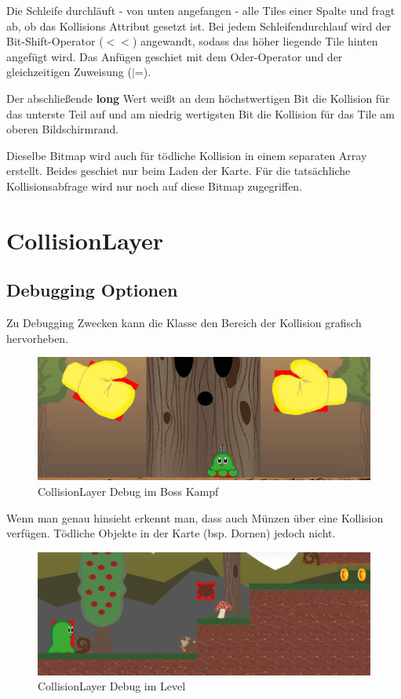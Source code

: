 Die Schleife durchläuft - von unten angefangen - alle Tiles einer Spalte und fragt ab, ob das Kollisions Attribut gesetzt ist. Bei jedem Schleifendurchlauf wird der Bit-Shift-Operator ($<<$) angewandt, sodass das höher liegende Tile hinten angefügt wird. Das Anfügen geschiet mit dem Oder-Operator und der gleichzeitigen Zuweisung ($|$=).

Der abschließende \textbf{long} Wert weißt an dem höchstwertigen Bit die Kollision für das unterste Teil auf und am niedrig wertigsten Bit die Kollision für das Tile am oberen Bildschirmrand.

Dieselbe Bitmap wird auch für tödliche Kollision in einem separaten Array erstellt. Beides geschiet nur beim Laden der Karte. Für die tatsächliche Kollisionsabfrage wird nur noch auf diese Bitmap zugegriffen.



\section{CollisionLayer}\label{sec:4_CollisionLayer}
\subsection{Debugging Optionen}\label{sec:CollisionLayerDebug}

Zu Debugging Zwecken kann die  Klasse den Bereich der Kollision grafisch hervorheben.

\begin{figure}[H]
  \centering
  \includegraphics[width=\textwidth - 50pt]{resources/CollisionLayer_BossKampf.jpg}
  \caption{CollisionLayer Debug im Boss Kampf}
  \label{fig:collision_debug_boss} 
\end{figure}

Wenn man genau hinsieht erkennt man, dass auch Münzen über eine Kollision verfügen. Tödliche Objekte in der Karte (bsp. Dornen) jedoch nicht.

\begin{figure}[H]
  \centering
  \includegraphics[width=\textwidth - 50pt]{resources/CollisionLayer_Level}
  \caption{CollisionLayer Debug im Level}
  \label{fig:collision_debug_level} 
\end{figure}


